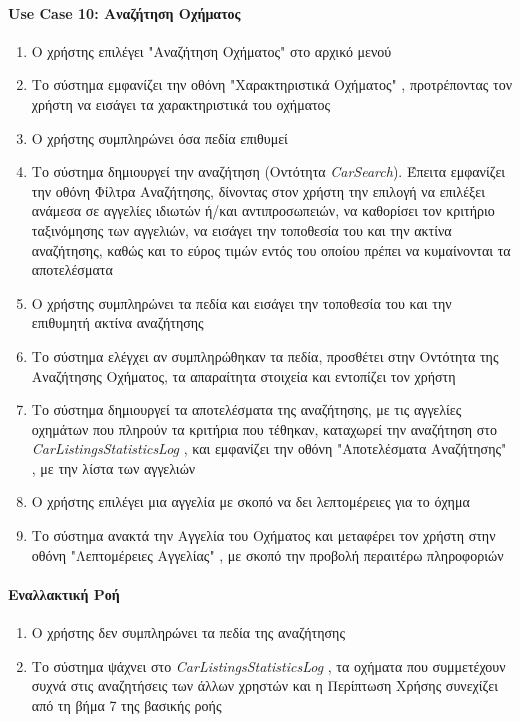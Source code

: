 \documentclass{../ol-softwaremanual}
\begin{document}
	
	
	\newpage
	\centering
	\paragraph{\en Use Case 10: \gr Αναζήτηση Οχήματος}  
	\begin{enumerate}
		\item Ο χρήστης επιλέγει \en"\gr Αναζήτηση Οχήματος\en" \gr στο αρχικό μενού
		\item Το σύστημα εμφανίζει την οθόνη \en"\gr Χαρακτηριστικά Οχήματος\en" \gr, προτρέποντας τον χρήστη να εισάγει τα χαρακτηριστικά του οχήματος 
		\item Ο χρήστης συμπληρώνει όσα πεδία επιθυμεί
		\item Το σύστημα δημιουργεί την αναζήτηση (Οντότητα \en \textit{CarSearch}\gr). Έπειτα εμφανίζει την οθόνη Φίλτρα Αναζήτησης, δίνοντας στον χρήστη την επιλογή να επιλέξει ανάμεσα σε αγγελίες ιδιωτών ή/και αντιπροσωπειών, να καθορίσει τον κριτήριο ταξινόμησης των αγγελιών, να εισάγει την τοποθεσία του και την ακτίνα αναζήτησης, καθώς και το εύρος τιμών εντός του οποίου πρέπει να κυμαίνονται τα αποτελέσματα
		\item Ο χρήστης συμπληρώνει τα πεδία και εισάγει την τοποθεσία του και την επιθυμητή ακτίνα αναζήτησης
		\item Το σύστημα ελέγχει αν συμπληρώθηκαν τα πεδία, προσθέτει στην Οντότητα της Αναζήτησης Οχήματος, τα απαραίτητα στοιχεία και εντοπίζει τον χρήστη 
		\item Το σύστημα δημιουργεί τα αποτελέσματα της αναζήτησης, με τις αγγελίες οχημάτων που πληρούν τα κριτήρια που τέθηκαν, καταχωρεί την αναζήτηση στο \en \textit{CarListingsStatisticsLog} \gr, και εμφανίζει την οθόνη \en"\gr Αποτελέσματα Αναζήτησης\en" \gr, με την λίστα των αγγελιών 
		\item Ο χρήστης επιλέγει μια αγγελία με σκοπό να δει λεπτομέρειες για το όχημα
		\item Το σύστημα ανακτά την Αγγελία του Οχήματος και μεταφέρει τον χρήστη στην οθόνη \en"\gr Λεπτομέρειες Αγγελίας\en" \gr, με σκοπό την προβολή περαιτέρω πληροφοριών	
	\end{enumerate}
	
	
	\paragraph{Εναλλακτική Ροή}
	\begin{enumerate}
		\item Ο χρήστης δεν συμπληρώνει τα πεδία της αναζήτησης
		\item Το σύστημα ψάχνει στο \en \textit{CarListingsStatisticsLog} \gr, τα οχήματα που συμμετέχουν συχνά στις αναζητήσεις των άλλων χρηστών και η Περίπτωση Χρήσης συνεχίζει από τη βήμα 7 της βασικής ροής
	\end{enumerate}
	
\end{document}
